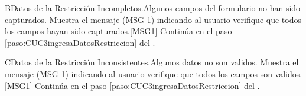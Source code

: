 	\begin{UCtrayectoriaA}{B}{Datos de la Restricción Incompletos.}{Algunos campos del formulario no han sido capturados.}
			\UCpaso Muestra el mensaje (MSG-1) indicando al usuario verifique que todos los campos hayan sido capturados.\ref{MSG1}
			\UCpaso Continúa en el paso \ref{paso:CUC3ingresaDatosRestriccion} del .
	\end{UCtrayectoriaA}

	\begin{UCtrayectoriaA}{C}{Datos de la Restricción Inconsistentes.}{Algunos datos  no son validos.}
			\UCpaso Muestra el mensaje (MSG-1) indicando al usuario verifique que todos los campos son validos.\ref{MSG1}
			\UCpaso Continúa en el paso \ref{paso:CUC3ingresaDatosRestriccion} del .
	\end{UCtrayectoriaA}